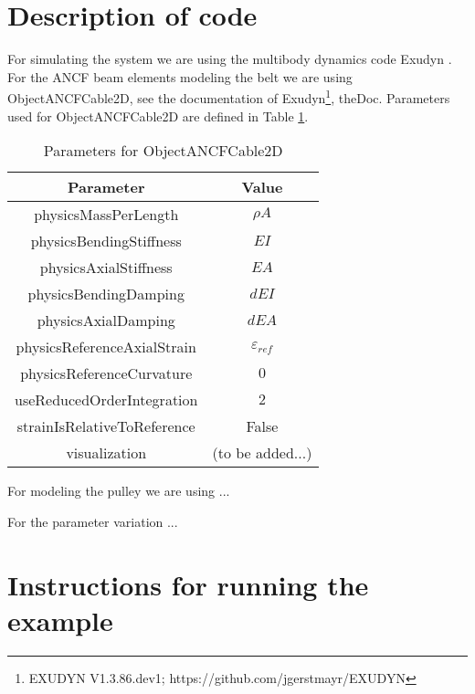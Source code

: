 \section{Description of code}
For simulating the system we are using the multibody dynamics code Exudyn \cite{Gerstmayr2022}. 
%
For the ANCF beam elements modeling the belt we are using ObjectANCFCable2D, see the documentation of Exudyn\footnote{EXUDYN V1.3.86.dev1; https://github.com/jgerstmayr/EXUDYN}, theDoc.
Parameters used for ObjectANCFCable2D are defined in Table \ref{tab:ObjectANCFCable2D}.
\begin{table}
    \caption{Parameters for ObjectANCFCable2D} \label{tab:ObjectANCFCable2D}
    \centering
    \begin{tabular}{c|c} \hline
        Parameter & Value \\ \hline 
        physicsMassPerLength & $\rho A$\\
        physicsBendingStiffness & $EI$\\
        physicsAxialStiffness & $EA$\\
        physicsBendingDamping & $dEI$\\
        physicsAxialDamping & $dEA$\\
        physicsReferenceAxialStrain  & $\varepsilon_{ref}$\\
        physicsReferenceCurvature & $0$\\
        useReducedOrderIntegration & $2$\\
        strainIsRelativeToReference & False\\
        visualization & (to be added...)\\ \hline
    \end{tabular}
\end{table}


For modeling the pulley we are using ...


For the parameter variation ...

\section{Instructions for running the example}